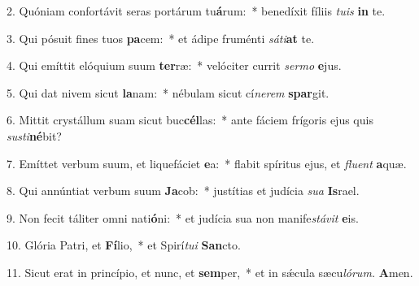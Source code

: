 \item 2. Quóniam confortávit seras portárum tu\textbf{á}rum:~* benedíxit fíliis \textit{tuis} \textbf{in} te.
\item 3. Qui pósuit fines tuos \textbf{pa}cem:~* et ádipe fruménti \textit{sáti}\textbf{at} te.
\item 4. Qui emíttit elóquium suum \textbf{ter}ræ:~* velóciter currit \textit{sermo} \textbf{e}jus.
\item 5. Qui dat nivem sicut \textbf{la}nam:~* nébulam sicut cí\hspace{0.03em}\textit{nerem} \textbf{spar}git.
\item 6. Mittit crystállum suam sicut buc\textbf{cél}las:~* ante fáciem frígoris ejus quis \textit{sus\-ti}\textbf{né}bit?
\item 7. Emíttet verbum suum, et liquefáciet \textbf{e}a:~* flabit spíritus ejus, et \textit{fluent} \textbf{a}quæ.
\item 8. Qui annúntiat verbum suum \textbf{Ja}cob:~* justítias et judícia \textit{sua} \textbf{Is}rael.
\item 9. Non fecit táliter omni nati\textbf{ó}ni:~* et judícia sua non manife\hspace{0.03em}\textit{stávit} \textbf{e}is.
\item 10. Glória Patri, et \textbf{Fí}lio,~* et Spirí\hspace{0.03em}\textit{tui} \textbf{San}cto.
\item 11. Sicut erat in princípio, et nunc, et \textbf{sem}per,~* et in sǽcula sæcu\hspace{0.03em}\textit{lórum.} \textbf{A}men.
